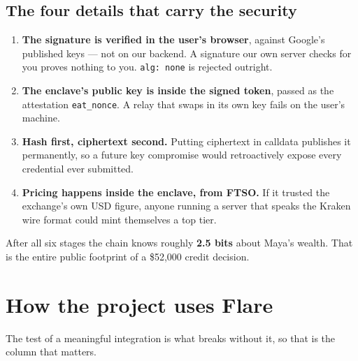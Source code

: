 \documentclass[11pt,a4paper]{article}
\newcommand{\code}[1]{\texttt{\small #1}}
\begin{document}
\subsection{The four details that carry the security}

\begin{enumerate}[leftmargin=1.4em, itemsep=0.4em]
  \item \textbf{The signature is verified in the user's browser}, against
        Google's published keys --- not on our backend. A signature our own
        server checks for you proves nothing to you. \code{alg: none} is
        rejected outright.
  \item \textbf{The enclave's public key is inside the signed token}, passed as
        the attestation \code{eat\_nonce}. A relay that swaps in its own key
        fails on the user's machine.
  \item \textbf{Hash first, ciphertext second.} Putting ciphertext in calldata
        publishes it permanently, so a future key compromise would
        retroactively expose every credential ever submitted.
  \item \textbf{Pricing happens inside the enclave, from FTSO.} If it trusted
        the exchange's own USD figure, anyone running a server that speaks the
        Kraken wire format could mint themselves a top tier.
\end{enumerate}

After all six stages the chain knows roughly \textbf{2.5 bits} about Maya's
wealth. That is the entire public footprint of a \$52,000 credit decision.

\section{How the project uses Flare}

The test of a meaningful integration is what breaks without it, so that is the
column that matters.
\end{document}
